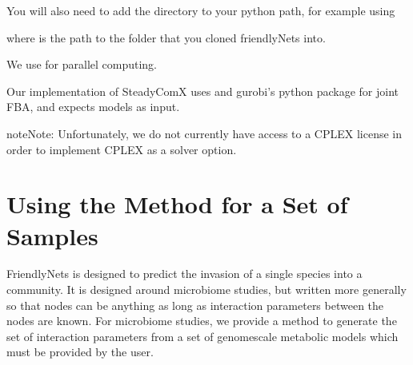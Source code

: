 \documentclass[letterpaper,10pt,english]{sphinxmanual}
\begin{document}
\sphinxAtStartPar
You will also need to add the directory to your python path, for example using

\begin{sphinxVerbatim}[commandchars=\\\{\}]
 
 
\end{sphinxVerbatim}

\sphinxAtStartPar
where  is the path to the folder that you cloned friendlyNets into.

\sphinxAtStartPar
{}

\sphinxAtStartPar
We use  for parallel computing.

\sphinxAtStartPar
Our implementation of SteadyComX uses  and gurobi’s python package for joint FBA, and expects  models as input.

\begin{sphinxadmonition}{note}{Note:}
\sphinxAtStartPar
Unfortunately, we do not currently have access to a CPLEX license in order to implement CPLEX as a solver option.
\end{sphinxadmonition}


\section{Using the Method for a Set of Samples}
\label{\detokenize{usage:using-the-method-for-a-set-of-samples}}
\sphinxAtStartPar
FriendlyNets is designed to predict the invasion of a single species into a community. It is designed around microbiome studies, but written more generally so that nodes can be anything as long as interaction parameters between
the nodes are known. For microbiome studies, we provide a method to generate the set of interaction parameters from a set of genome\sphinxhyphen{}scale metabolic models which must be provided by the user.
\end{document}
